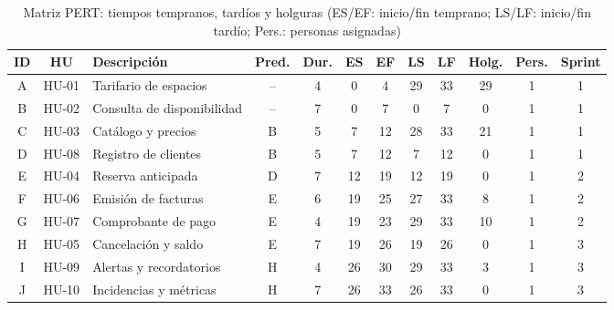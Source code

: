 \documentclass[12pt,a4paper]{article}
\begin{document}
\begin{table}[H]
\centering
\footnotesize
\setlength{\tabcolsep}{3.5pt}
\caption[Matriz PERT: tiempos tempranos, tard\'ios y holguras]{Matriz PERT: tiempos tempranos, tard\'ios y holguras (ES/EF: inicio/fin temprano; LS/LF: inicio/fin tard\'io; Pers.: personas asignadas)}
\label{tab:pert}
\begin{tabular}{c c p{3.4cm} c c c c c c c c c}
\toprule
\textbf{ID} & \textbf{HU} & \textbf{Descripci\'on} & \textbf{Pred.} & \textbf{Dur.} & \textbf{ES} & \textbf{EF} & \textbf{LS} & \textbf{LF} & \textbf{Holg.} & \textbf{Pers.} & \textbf{Sprint} \\
\midrule
A & HU-01 & Tarifario de espacios & -- & 4 & 0 & 4 & 29 & 33 & 29 & 1 & 1 \\
B & HU-02 & Consulta de disponibilidad & -- & 7 & 0 & 7 & 0 & 7 & 0 & 1 & 1 \\
C & HU-03 & Cat\'alogo y precios & B & 5 & 7 & 12 & 28 & 33 & 21 & 1 & 1 \\
D & HU-08 & Registro de clientes & B & 5 & 7 & 12 & 7 & 12 & 0 & 1 & 1 \\
E & HU-04 & Reserva anticipada & D & 7 & 12 & 19 & 12 & 19 & 0 & 1 & 2 \\
F & HU-06 & Emisi\'on de facturas & E & 6 & 19 & 25 & 27 & 33 & 8 & 1 & 2 \\
G & HU-07 & Comprobante de pago & E & 4 & 19 & 23 & 29 & 33 & 10 & 1 & 2 \\
H & HU-05 & Cancelaci\'on y saldo & E & 7 & 19 & 26 & 19 & 26 & 0 & 1 & 3 \\
I & HU-09 & Alertas y recordatorios & H & 4 & 26 & 30 & 29 & 33 & 3 & 1 & 3 \\
J & HU-10 & Incidencias y m\'etricas & H & 7 & 26 & 33 & 26 & 33 & 0 & 1 & 3 \\
\bottomrule
\end{tabular}
\end{table}
\end{document}

